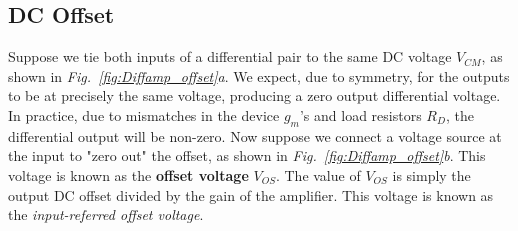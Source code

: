 \subsection{DC Offset}
Suppose we tie both inputs of a differential pair to the same DC voltage $V_{CM}$, as shown in \emph{Fig.~\ref{fig:Diffamp_offset}a}.  We expect, due to symmetry, for the outputs to be at precisely the same voltage, producing a zero output differential voltage.  In practice, due to mismatches in the device $g_m$'s and load resistors $R_D$, the differential output will be non-zero.  Now suppose we connect a voltage source at the input to "zero out" the offset, as shown in \emph{Fig.~\ref{fig:Diffamp_offset}b}.  This voltage is known as the \textbf{offset voltage} $V_{OS}$.  The value of $V_{OS}$ is simply the output DC offset divided by the gain of the amplifier.  This voltage is known as the \textit{input-referred offset voltage}.

